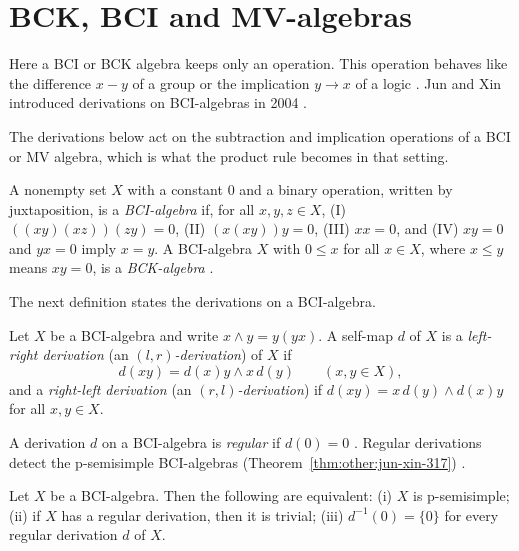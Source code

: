 \section{BCK, BCI and MV-algebras}\label{sec:other-systems:bci-mv}

Here a BCI or BCK algebra keeps only an operation.
This operation behaves like the difference
$x - y$ of a group or the implication $y \to x$ of a logic
\cite[p.~167]{JunXin2004}. Jun and Xin
introduced derivations on BCI-algebras in 2004
\cite[p.~167]{JunXin2004}.

The derivations below act on the subtraction and implication operations of a BCI or MV algebra, which is what the product rule becomes in that setting.

\begin{definition}\label{def:other:bci}
A nonempty set $X$ with a constant $0$ and a binary operation, written by
juxtaposition, is a \emph{BCI-algebra} if, for all $x, y, z \in X$,
\textup{(I)} $((xy)(xz))(zy) = 0$,
\textup{(II)} $(x(xy))y = 0$,
\textup{(III)} $xx = 0$, and
\textup{(IV)} $xy = 0$ and $yx = 0$ imply $x = y$.
A BCI-algebra $X$ with $0 \le x$ for all $x \in X$, where $x \le y$ means
$xy = 0$, is a \emph{BCK-algebra} \cite[p.~168]{JunXin2004}.
\end{definition}

The next definition states the derivations on a BCI-algebra.

\begin{definition}\label{def:other:lr-derivation}
Let $X$ be a BCI-algebra and write $x \wedge y = y(yx)$. A self-map $d$
of $X$ is a \emph{left-right derivation} (an \emph{$(l, r)$-derivation})
of $X$ if
\[
d(xy) = d(x)y \wedge x\,d(y) \qquad (x, y \in X),
\]
and a \emph{right-left derivation} (an \emph{$(r, l)$-derivation}) if
$d(xy) = x\,d(y) \wedge d(x)y$ for all $x, y \in X$.
\end{definition}

A derivation $d$ on a BCI-algebra is \emph{regular} if $d(0) = 0$
\cite[Definition~3.12, p.~173]{JunXin2004}. Regular derivations detect
the p-semisimple BCI-algebras (Theorem~\ref{thm:other:jun-xin-317})
\cite[Theorem~3.17, p.~174]{JunXin2004}.\begin{theorem}\label{thm:other:jun-xin-317}
Let $X$ be a BCI-algebra. Then the following are equivalent:
\textup{(i)} $X$ is p-semisimple; \textup{(ii)} if $X$ has a regular
derivation, then it is trivial; \textup{(iii)} $d^{-1}(0) = \{0\}$ for
every regular derivation $d$ of $X$.
\end{theorem}

